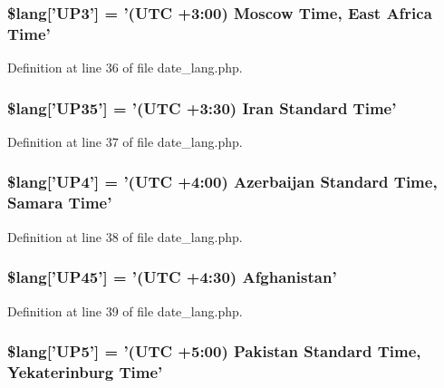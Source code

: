 \subsubsection[{\$lang}]{\setlength{\rightskip}{0pt plus 5cm}\$lang['U\-P3'] = '(U\-T\-C +3\-:00) Moscow Time, East Africa Time'}\label{date__lang_8php_a5eddd4b83edcbefcc883077949d40a67}


Definition at line 36 of file date\-\_\-lang.\-php.

\subsubsection[{\$lang}]{\setlength{\rightskip}{0pt plus 5cm}\$lang['U\-P35'] = '(U\-T\-C +3\-:30) Iran Standard Time'}\label{date__lang_8php_ad669ea69fd450762d029592b6ac64395}


Definition at line 37 of file date\-\_\-lang.\-php.

\subsubsection[{\$lang}]{\setlength{\rightskip}{0pt plus 5cm}\$lang['U\-P4'] = '(U\-T\-C +4\-:00) Azerbaijan Standard Time, Samara Time'}\label{date__lang_8php_ad0131a14a1ede9328baf1a1827602f45}


Definition at line 38 of file date\-\_\-lang.\-php.

\subsubsection[{\$lang}]{\setlength{\rightskip}{0pt plus 5cm}\$lang['U\-P45'] = '(U\-T\-C +4\-:30) Afghanistan'}\label{date__lang_8php_a7795735f3608127d726a4fca3f87dc79}


Definition at line 39 of file date\-\_\-lang.\-php.

\subsubsection[{\$lang}]{\setlength{\rightskip}{0pt plus 5cm}\$lang['U\-P5'] = '(U\-T\-C +5\-:00) Pakistan Standard Time, Yekaterinburg Time'}\label{date__lang_8php_a08236ffa5ff4db9f2bc023f5256fead1}


